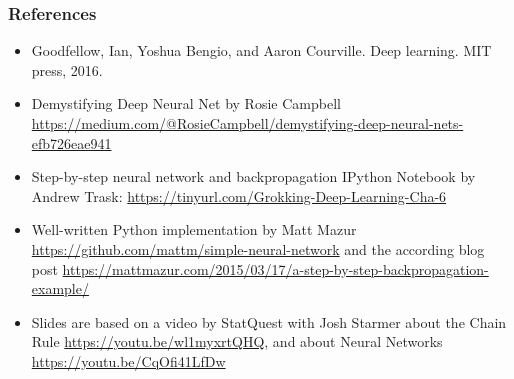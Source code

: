 \documentclass[aspectratio=169]{beamer}
\begin{document}
\begin{frame}\frametitle{References}
\begin{itemize}
    \item Goodfellow, Ian, Yoshua Bengio, and Aaron Courville. Deep learning. MIT press, 2016.
    \item Demystifying Deep Neural Net by Rosie Campbell \url{https://medium.com/@RosieCampbell/demystifying-deep-neural-nets-efb726eae941}
    \item Step-by-step neural network and backpropagation IPython Notebook by Andrew Trask: \url{https://tinyurl.com/Grokking-Deep-Learning-Cha-6}
    \item Well-written Python implementation by Matt Mazur \url{https://github.com/mattm/simple-neural-network} and the according blog post \url{https://mattmazur.com/2015/03/17/a-step-by-step-backpropagation-example/}
    \item Slides are based on a video by StatQuest with Josh Starmer about the Chain Rule \url{https://youtu.be/wl1myxrtQHQ}, and about Neural Networks \url{https://youtu.be/CqOfi41LfDw} 
\end{itemize}
\end{frame}
\end{document}

